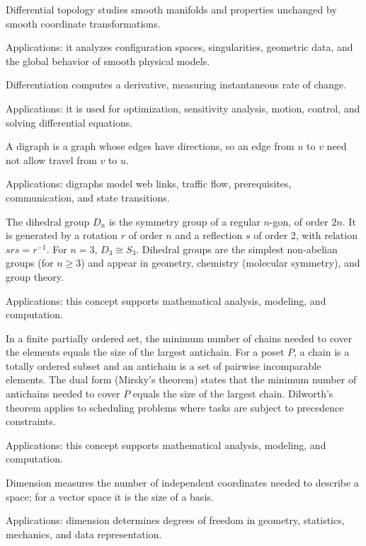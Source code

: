 Differential topology studies smooth manifolds and properties unchanged by smooth coordinate transformations. \par\noindent Applications: it analyzes configuration spaces, singularities, geometric data, and the global behavior of smooth physical models.

Differentiation computes a derivative, measuring instantaneous rate of change. \par\noindent Applications: it is used for optimization, sensitivity analysis, motion, control, and solving differential equations.

A digraph is a graph whose edges have directions, so an edge from $u$ to $v$ need not allow travel from $v$ to $u$. \par\noindent Applications: digraphs model web links, traffic flow, prerequisites, communication, and state transitions.

The dihedral group $D_n$ is the symmetry group of a regular $n$-gon, of order $2n$. It is generated by a rotation $r$ of order $n$ and a reflection $s$ of order 2, with relation $srs = r^{-1}$. For $n = 3$, $D_3 \cong S_3$. Dihedral groups are the simplest non-abelian groups (for $n \geq 3$) and appear in geometry, chemistry (molecular symmetry), and group theory. \par\noindent Applications: this concept supports mathematical analysis, modeling, and computation.

In a finite partially ordered set, the minimum number of chains needed to cover the elements equals the size of the largest antichain. For a poset $P$, a chain is a totally ordered subset and an antichain is a set of pairwise incomparable elements. The dual form (Mirsky's theorem) states that the minimum number of antichains needed to cover $P$ equals the size of the largest chain. Dilworth's theorem applies to scheduling problems where tasks are subject to precedence constraints. \par\noindent Applications: this concept supports mathematical analysis, modeling, and computation.

Dimension measures the number of independent coordinates needed to describe a space; for a vector space it is the size of a basis. \par\noindent Applications: dimension determines degrees of freedom in geometry, statistics, mechanics, and data representation.

